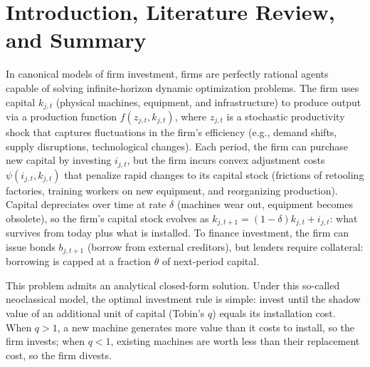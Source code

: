 \section{Introduction, Literature Review, and Summary}

In canonical models of firm investment, firms are perfectly rational agents capable of 
solving infinite-horizon dynamic optimization problems. The firm uses capital $k_{j,t}$ 
(physical machines, equipment, and infrastructure) to produce output via a production 
function $f(z_{j,t}, k_{j,t})$, where $z_{j,t}$ is a stochastic productivity shock that 
captures fluctuations in the firm's efficiency (e.g., demand shifts, supply 
disruptions, technological changes). Each period, the firm can purchase new capital by 
investing $i_{j,t}$, but the firm incurs convex adjustment costs $\psi(i_{j,t}, k_{j,t})$ that penalize rapid changes to its capital 
stock (frictions of retooling factories, training workers on new equipment, and reorganizing production). 
Capital depreciates over time at rate $\delta$ (machines wear out, equipment becomes obsolete), 
so the firm's capital stock evolves as $k_{j,t+1} = (1-\delta)k_{j,t} + i_{j,t}$: what 
survives from today plus what is installed. To finance investment, the firm can issue bonds $b_{j,t+1}$ (borrow from 
external creditors), but lenders require collateral: borrowing is capped at a fraction 
$\theta$ of next-period capital.

This problem admits an analytical closed-form solution.
Under this so-called neoclassical model, the optimal investment rule is simple: invest 
until the shadow value of an additional unit of capital (Tobin's $q$) equals its 
installation cost. When $q > 1$, a new machine generates more value than it costs to 
install, so the firm invests; when $q < 1$, existing machines are worth less than their 
replacement cost, so the firm divests.

